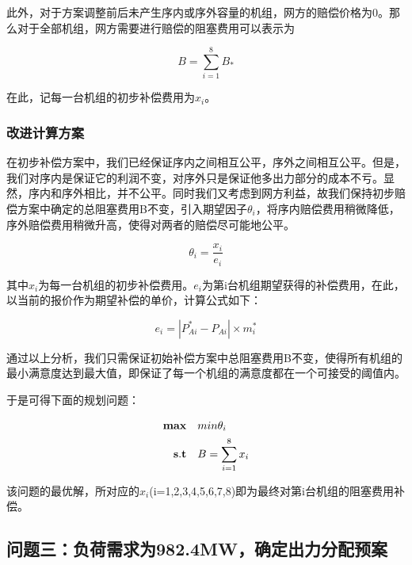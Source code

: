 \documentclass[12pt,a4paper]{ctexart}
\begin{document}
此外，对于方案调整前后未产生序内或序外容量的机组，网方的赔偿价格为0。那么对于全部机组，网方需要进行赔偿的阻塞费用可以表示为

\begin{equation}
	B=\sum_{i=1}^{8} B_{*}
	\label{3}
\end{equation}

在此，记每一台机组的初步补偿费用为$x_{i}$。


\subsubsection*{改进计算方案}

在初步补偿方案中，我们已经保证序内之间相互公平，序外之间相互公平。但是，我们对序内是保证它的利润不变，对序外只是保证他多出力部分的成本不亏。显然，序内和序外相比，并不公平。同时我们又考虑到网方利益，故我们保持初步赔偿方案中确定的总阻塞费用B不变，引入期望因子$\theta_{i}$，将序内赔偿费用稍微降低，序外赔偿费用稍微升高，使得对两者的赔偿尽可能地公平。

\begin{equation}
	\theta_{i} =\dfrac{x_{i}}{e_{i}}
	\label{3}
\end{equation}

	其中$x_{i}$为每一台机组的初步补偿费用。$e_{i}$为第i台机组期望获得的补偿费用，在此，以当前的报价作为期望补偿的单价，计算公式如下：

\begin{equation}
		e_{i}=|P_{Ai}^{*}-P_{Ai}|\times m_{i}^{*}
		\label{4}
\end{equation}
	
通过以上分析，我们只需保证初始补偿方案中总阻塞费用B不变，使得所有机组的最小满意度达到最大值，即保证了每一个机组的满意度都在一个可接受的阈值内。

于是可得下面的规划问题：

\begin{equation*}
	\begin{split}
		{\bf max}\quad &min \theta_{i}\\
		{\bf s.t}\quad &B= \sum_{i=1}^{8}x_{i}\\
	\end{split}
\end{equation*}

该问题的最优解，所对应的$x_{i}$\space(i=1,2,3,4,5,6,7,8)即为最终对第i台机组的阻塞费用补偿。





	\subsection{问题三：负荷需求为982.4MW，确定出力分配预案}	
	
\end{document}
